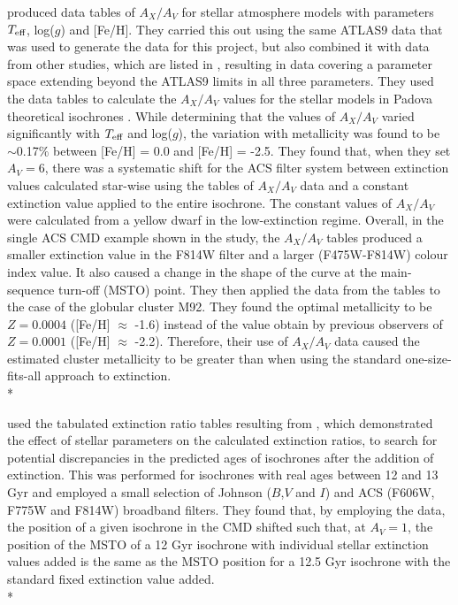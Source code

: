 \documentclass[12pt, a4paper]{report}
\begin{document}
\cite{2008PASP..120..583G} produced data tables of $A_{X}/A_{V}$ for stellar atmosphere models with parameters $T_{\textnormal{eff}}$, log($g$) and [Fe/H]. They carried this out using the same ATLAS9 data \citep{2004astro.ph..5087C} that was used to generate the data for this project, but also combined it with data from other studies, which are listed in \cite{2002A&A...391..195G}, resulting in data covering a parameter space extending beyond the ATLAS9 limits in all three parameters. They used the data tables to calculate the $A_{X}/A_{V}$ values for the stellar models in Padova theoretical isochrones \citep{1994A&AS..106..275B}. While determining that the values of $A_{X}/A_{V}$ varied significantly with $T_{\textnormal{eff}}$ and log($g$), the variation with metallicity was found to be $\sim$0.17$\%$ between [Fe/H] = 0.0 and [Fe/H] = -2.5. They found that, when they set $A_{V} = 6$, there was a systematic shift for the ACS filter system between extinction values calculated star-wise using the tables of $A_{X}/A_{V}$ data and a constant extinction value applied to the entire isochrone. The constant values of $A_{X}/A_{V}$ were calculated from a yellow dwarf in the low-extinction regime. Overall, in the single ACS CMD example shown in the study, the $A_{X}/A_{V}$ tables produced a smaller extinction value in the F814W filter and a larger (F475W-F814W) colour index value. It also caused a change in the shape of the curve at the main-sequence turn-off (MSTO) point. They then applied the data from the tables to the case of the globular cluster M92. They found the optimal metallicity to be $Z = 0.0004$ ([Fe/H] $\approx$ -1.6) instead of the value obtain by previous observers of $Z = 0.0001$ ([Fe/H] $\approx$ -2.2). Therefore, their use of $A_{X}/A_{V}$ data caused the estimated cluster metallicity to be greater than when using the standard one-size-fits-all approach to extinction.\\*

\cite{2017Galax...5...28O} used the tabulated extinction ratio tables resulting from \cite{2008PASP..120..583G}, which demonstrated the effect of stellar parameters on the calculated extinction ratios, to search for potential discrepancies in the predicted ages of isochrones after the addition of extinction. This was performed for isochrones with real ages between 12 and 13 Gyr and employed a small selection of Johnson ($B$,$V$ and $I$) and ACS (F606W, F775W and F814W) broadband filters. They found that, by employing the \cite{2008PASP..120..583G} data, the position of a given isochrone in the CMD shifted such that, at $A_{V} = 1$, the position of the MSTO of a 12 Gyr isochrone with individual stellar extinction values added is the same as the MSTO position for a 12.5 Gyr isochrone with the standard fixed extinction value added.\\*
\end{document}
